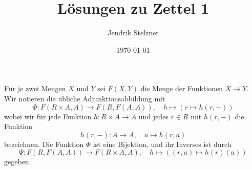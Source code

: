 \documentclass[a4paper, 10pt, numbers=noenddot]{scrartcl}
\title{Lösungen zu Zettel 1}
\author{Jendrik Stelzner}
\date{\today}
\begin{document}
\maketitle





\section{}

Für je zwei Mengen $X$ und $Y$ sei $F(X,Y)$ die Menge der Funktionen $X \to Y$.
Wir notieren die übliche Adjunktionsabbildung mit
\[
  \Phi \colon F(R \times A, A) \to F(R, F(A,A)),
  \quad
  h \mapsto (r \mapsto h(r, -))
\]
wobei wir für jede Funktion $h \colon R \times A \to A$ und jedes $r \in R$ mit $h(r,-)$ die Funktion
\[
  h(r, -) \colon A \to A,
  \quad
  a \mapsto h(r,a)
\]
bezeichnen.
Die Funktion $\Phi$ ist eine Bijektion, und ihr Inverses ist durch
\[
  \Psi \colon F(R, F(A,A)) \to F(R \times A, A),
  \quad
  h \mapsto ( (r,a) \mapsto h(r)(a) )
\]
gegeben.





\subsection{}
\end{document}

